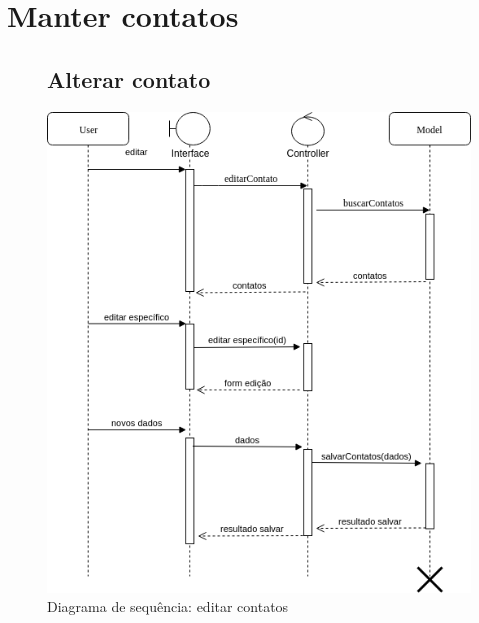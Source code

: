 \documentclass[
	12pt,				%
	openright,			%
	twoside,			%
	a4paper,			%
	english,			%
	french,				%
	spanish,			%
	brazil				%
]{abntex2}
\begin{document}
\section{Manter contatos}
\begin{figure}[h]
	\subsection{Alterar contato}
	\label{figure_diagrama_sequencia_alterar_contato}
	\caption{Diagrama de sequência: editar contatos}
	\includegraphics[scale=0.6]{SequenceContatos/SequenceEditarContato.png}
	\hfill
\end{figure}
%
\end{document}
